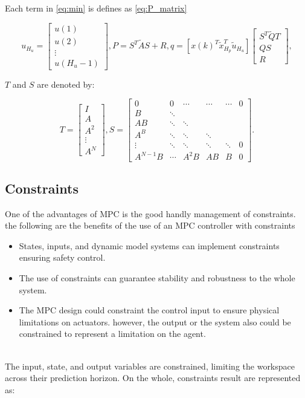 Each term in \ref{eq:min} is defines as \ref{eq:P_matrix}

\begin{equation}
    u_{H_u} = \begin{bmatrix}
u(1) \\
u(2) \\
\vdots  \\
u(H_u-1)
\end{bmatrix}, P=S^T\tilde{A}S + R, q=\left[ x(k)^T \tilde{x}^T_{H_p} \tilde{u}_{H_u}\right]
\begin{bmatrix}
S^T \tilde{Q}T \\
QS \\
R
\end{bmatrix},
\label{eq:P_matrix}
\end{equation}

$T$ and $S$ are denoted by:

\begin{equation}
T = \begin{bmatrix}
I \\
A \\
A^2 \\
\vdots  \\
A^N
\end{bmatrix},
S= \begin{bmatrix}
0 & 0 & \cdots  & \cdots & \cdots & 0 \\
B & \ddots  &  &  &  &  \\
AB & \ddots & \ddots &  &  &  \\
A^B & \ddots & \ddots & \ddots &  &  \\
\vdots & \ddots & \ddots & \ddots & \ddots & 0 \\
A^{N-1}B & \cdots & A^2B & AB & B & 0
\end{bmatrix}.
\end{equation}


\subsection{Constraints}


One of the advantages of MPC is the good handly management of constraints. the following are the benefits of the use of an MPC controller with constraints
\begin{itemize}
    \item States, inputs, and dynamic model systems can implement constraints ensuring safety control.
    \item The use of constraints can guarantee stability and robustness to the whole system.
    \item The MPC design could constraint the control input to ensure physical limitations on actuators. however, the output or the system also could be constrained to represent a limitation on the agent.
\end{itemize}
\\
The input, state, and output variables are constrained, limiting the workspace across their prediction horizon. On the whole, constraints result are represented as:

